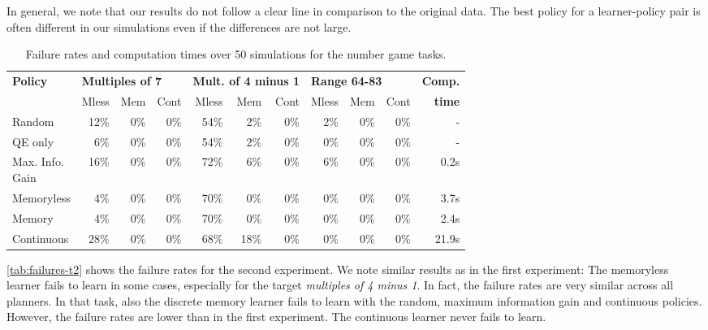 In general, we note that our results do not follow a clear line in comparison to the original data.
The best policy for a learner-policy pair is often different in our simulations even if the differences are not large.


\begin{table}
    \centering
    \small
    \begin{tabular}{l|rrr|rrr|rrr|r}
        \hline
        \textbf{Policy} & \multicolumn{3}{l|}{\textbf{Multiples of 7}}  & \multicolumn{3}{l|}{\textbf{Mult. of 4 minus 1}} &  \multicolumn{3}{l|}{\textbf{Range 64-83}} & \textbf{Comp.} \\
                        & Mless & Mem & Cont & Mless & Mem & Cont & Mless & Mem & Cont & \textbf{time} \\
        \hline
        Random          & 12\% & 0\% & 0\% &            54\% & 2\% & 0\% &      2\% & 0\% & 0\% & - \\
        QE only         & 6\% & 0\% & 0\% &            54\% & 2\% & 0\% &      0\% & 0\% & 0\%  & - \\
        \makecell[l]{Max. Info. \\ Gain} & 16\% & 0\% & 0\% &             72\% & 6\% & 0\% &      6\% & 0\% & 0\%  & 0.2s \\
        \hline
        Memoryless      & 4\% & 0\% & 0\% &            70\% & 0\% & 0\% &      0\% & 0\% & 0\%  & 3.7s \\
        Memory          & 4\% & 0\% & 0\% &            70\% & 0\% & 0\% &      0\% & 0\% & 0\%  & 2.4s \\
        Continuous      & 28\% & 0\% & 0\% &           68\% & 18\% & 0\% &       0\% & 0\% & 0\%  & 21.9s \\
        \hline
    \end{tabular}
    \caption{Failure rates and computation times over 50 simulations for the number game tasks. }
    \label{tab:failures-t2}
\end{table}

\autoref{tab:failures-t2} shows the failure rates for the second experiment. 
We note similar results as in the first experiment: The memoryless learner fails to learn in some cases, especially for the target \textit{multiples of 4 minus 1}. In fact, the failure rates are very similar across all planners.
In that task, also the discrete memory learner fails to learn with the random, maximum information gain and continuous policies.
However, the failure rates are lower than in the first experiment.
The continuous learner never fails to learn.


